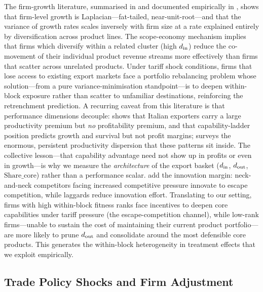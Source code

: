 The firm-growth literature, summarised in \citet{coad2009} and documented empirically
in \citet{bottazzi2003, bottazzi2005, bottazzi2006}, shows that firm-level growth is
Laplacian---fat-tailed, near-unit-root---and that the variance of growth rates scales
inversely with firm size at a rate explained entirely by diversification across product
lines. The scope-economy mechanism \citep{bottazzi2006} implies that firms which
diversify within a related cluster (high $d_{\rm in}$) reduce the co-movement of
their individual product revenue streams more effectively than firms that scatter across
unrelated products. Under tariff shock conditions, firms that lose access to existing
export markets face a portfolio rebalancing problem whose solution---from a pure
variance-minimisation standpoint---is to deepen within-block exposure rather than
scatter to unfamiliar destinations, reinforcing the retrenchment prediction. A
recurring caveat from this literature is that performance dimensions decouple:
\citet{grazzi2012} shows that Italian exporters carry a large productivity premium but
\emph{no} profitability premium, and \citet{coad2021} that capability-ladder position
predicts growth and survival but not profit margins; \citet{syverson2011} surveys the
enormous, persistent productivity dispersion that these patterns sit inside. The
collective lesson---that capability advantage need not show up in profits or even in
growth---is why we measure the \emph{architecture} of the export basket
($d_{\rm in}$, $d_{\rm out}$, $\text{Share\_core}$) rather than a performance scalar.
\citet{aghion2001, aghion2005} add the innovation margin: neck-and-neck competitors
facing increased competitive pressure innovate to escape competition, while laggards
reduce innovation effort. Translating to our setting, firms with high within-block
fitness ranks face incentives to deepen core capabilities under tariff pressure (the
escape-competition channel), while low-rank firms---unable to sustain the cost of
maintaining their current product portfolio---are more likely to prune $d_{\rm out}$
and consolidate around the most defensible core products. This generates the
within-block heterogeneity in treatment effects that we exploit empirically.

\subsection{Trade Policy Shocks and Firm Adjustment}
\label{subsec:lit_trade}

